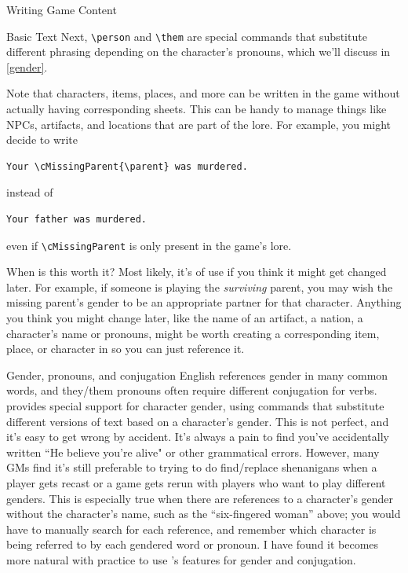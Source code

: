 \documentclass[sheet]{GameTexBase}
\begin{document}
\begin{section}{Writing Game Content}
\begin{subsection}{Basic \gametex{} Text}
Next, \lstinline{\person} and \lstinline{\them} are special \gametex{} commands that substitute different phrasing depending on the character's pronouns, which we'll discuss in \ref{gender}.

Note that characters, items, places, and more can be written in the game without actually having corresponding sheets.  This can be handy to manage things like NPCs, artifacts, and locations that are part of the lore.  For example, you might decide to write 
\begin{verbatim}
Your \cMissingParent{\parent} was murdered.
\end{verbatim}
instead of 
\begin{verbatim}
Your father was murdered.
\end{verbatim}
even if \lstinline|\cMissingParent| is only present in the game's lore.

When is this worth it?  Most likely, it's of use if you think it might get changed later.  For example, if someone is playing the \emph{surviving} parent, you may wish the missing parent's gender to be an appropriate partner for that character.  Anything you think you might change later, like the name of an artifact, a nation, a character's name or pronouns, might be worth creating a corresponding item, place, or character in \gametex{} so you can just reference it.

\end{subsection}
\begin{subsection}{Gender, pronouns, and conjugation}
\label{gender}
English references gender in many common words, and they/them pronouns often require different conjugation for verbs.  \gametex{} provides special support for character gender, using commands that substitute different versions of text based on a character's gender.  This is not perfect, and it's easy to get wrong by accident.  It's always a pain to find you've accidentally written ``He believe you're alive" or other grammatical errors.  However, many GMs find it's still preferable to trying to do find/replace shenanigans when a player gets recast or a game gets rerun with players who want to play different genders.  This is especially true when there are references to a character's gender without the character's name, such as the ``six-fingered woman'' above; you would have to manually search for each reference, and remember which character is being referred to by each gendered word or pronoun.  I have found it becomes more natural with practice to use \gametex{}'s features for gender and conjugation.


\end{subsection}
\end{section}
\end{document}
